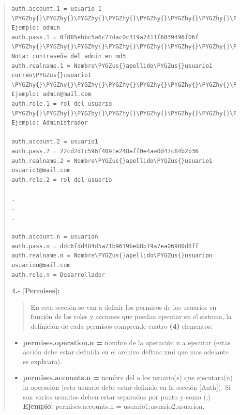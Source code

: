 \documentclass[letterpaper,11pt,spanish]{sphinxmanual}
\def\PYGZus{\char`\_}
\def\PYGZgt{\char`\>}
\def\PYGZhy{\char`\-}
\begin{document}
\begin{quote}
\begin{Verbatim}[commandchars=\\\{\}]
auth.account.1 = usuario 1            \PYGZhy{}\PYGZhy{}\PYGZhy{}\PYGZhy{}\PYGZhy{}\PYGZhy{}\PYGZhy{}\PYGZhy{}\PYGZhy{}\PYGZhy{}\PYGZhy{}\PYGZhy{}\PYGZhy{}\PYGZhy{}\PYGZhy{}\PYGZhy{}\PYGZhy{}\PYGZhy{}\PYGZhy{}\PYGZhy{}\PYGZhy{}\PYGZhy{}\PYGZhy{}\PYGZhy{}\PYGZhy{}\PYGZhy{}\PYGZhy{}\PYGZhy{}\PYGZhy{}\PYGZhy{}\PYGZhy{}\PYGZhy{}\PYGZhy{}\PYGZhy{}\PYGZhy{}\PYGZhy{}\PYGZhy{}\PYGZhy{}\PYGZgt{} Ejemplo: admin
auth.pass.1 = 0f885ebbc5a6c77dac0c319a7411f6039496f06f        \PYGZhy{}\PYGZhy{}\PYGZhy{}\PYGZhy{}\PYGZhy{}\PYGZhy{}\PYGZhy{}\PYGZhy{}\PYGZhy{}\PYGZhy{}\PYGZhy{}\PYGZhy{}\PYGZhy{}\PYGZhy{}\PYGZgt{} Nota: contraseña del admin en md5
auth.realname.1 = Nombre\PYGZus{}apellido\PYGZus{}usuario1  correo\PYGZus{}usuario1   \PYGZhy{}\PYGZhy{}\PYGZhy{}\PYGZhy{}\PYGZhy{}\PYGZhy{}\PYGZhy{}\PYGZhy{}\PYGZhy{}\PYGZhy{}\PYGZhy{}\PYGZhy{}\PYGZhy{}\PYGZhy{}\PYGZgt{} Ejemplo: admin@mail.com
auth.role.1 = rol del usuario                                 \PYGZhy{}\PYGZhy{}\PYGZhy{}\PYGZhy{}\PYGZhy{}\PYGZhy{}\PYGZhy{}\PYGZhy{}\PYGZhy{}\PYGZhy{}\PYGZhy{}\PYGZhy{}\PYGZhy{}\PYGZhy{}\PYGZgt{} Ejemplo: Administrador

auth.account.2 = usuario1
auth.pass.2 = 22cd2d1c596f4091e248aff0e4aa0d47c84b2b36
auth.realname.2 = Nombre\PYGZus{}apellido\PYGZus{}usuario1 usuario1@mail.com
auth.role.2 = rol del usuario

.
.
.

auth.account.n = usuarion
auth.pass.n = ddc6fdd484d5a71b9619beb8b19a7ea06980d8ff
auth.realname.n = Nombre\PYGZus{}apellido\PYGZus{}usuarion usuarion@mail.com
auth.role.n = Desarrollador
\end{Verbatim}

\textbf{4.- {[}Permises{]}:}
\begin{quote}

En esta sección se van a definir los permisos de los usuarios en función de los roles y acciones que puedan ejecutar en el sistema, la definición de cada permisos comprende cuatro \textbf{(4)} elementos:
\end{quote}
\begin{itemize}
\item {} 
\textbf{permises.operation.n =}  nombre de la operación n a ejecutar (estas acción debe estar definida en el archivo deftrac.xml que mas adelante se explicara).

\item {} 
\textbf{permises.accounts.n =} nombre del o los usuario(s) que ejecutara(n) la operación (esta usuario debe estar definido en la sección {[}Auth{]}). Si son varios usuarios deben estar separados por punto y como (;) \textbf{Ejemplo:} permises.accounts.n = usuario1;usuario2;usuarion.


\end{itemize}
\end{quote}
\end{document}
